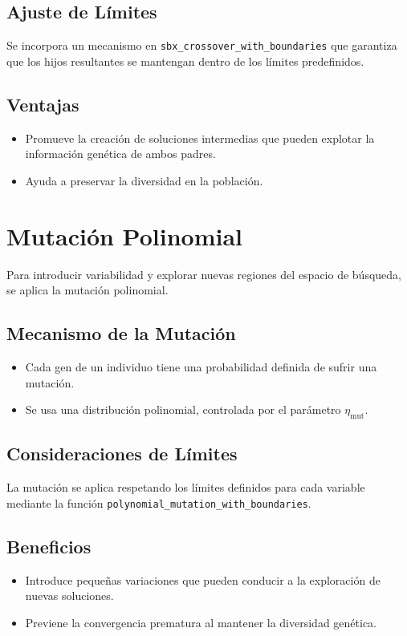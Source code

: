 \subsection*{Ajuste de L\'imites}
Se incorpora un mecanismo en \texttt{sbx\_crossover\_with\_boundaries} que garantiza que los hijos resultantes se mantengan dentro de los l\'imites predefinidos.

\subsection*{Ventajas}
\begin{itemize}
    \item Promueve la creaci\'on de soluciones intermedias que pueden explotar la informaci\'on gen\'etica de ambos padres.
    \item Ayuda a preservar la diversidad en la poblaci\'on.
\end{itemize}

\section{Mutaci\'on Polinomial}

Para introducir variabilidad y explorar nuevas regiones del espacio de b\'usqueda, se aplica la mutaci\'on polinomial.

\subsection*{Mecanismo de la Mutaci\'on}
\begin{itemize}
    \item Cada gen de un individuo tiene una probabilidad definida de sufrir una mutaci\'on.
    \item Se usa una distribuci\'on polinomial, controlada por el par\'ametro $\eta_{\text{mut}}$.
\end{itemize}

\subsection*{Consideraciones de L\'imites}
La mutaci\'on se aplica respetando los l\'imites definidos para cada variable mediante la funci\'on \texttt{polynomial\_mutation\_with\_boundaries}.

\subsection*{Beneficios}
\begin{itemize}
    \item Introduce peque\~nas variaciones que pueden conducir a la exploraci\'on de nuevas soluciones.
    \item Previene la convergencia prematura al mantener la diversidad gen\'etica.
\end{itemize}

